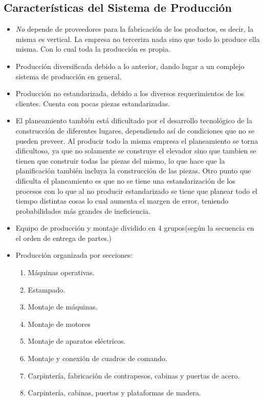 \subsection{Caracter\'{i}sticas del Sistema de Producci\'{o}n}
\begin{itemize}
	\item \emph{No} depende de proveedores para la fabricaci\'{o}n de los productos, es decir, la misma es vertical. La empresa no terceriza nada sino que todo lo produce ella misma. Con lo cual toda la producci\'{o}n es propia.
	\item Producci\'{o}n diversificada debido a lo anterior, dando lugar a un complejo sistema de producci\'on en general.
	\item Producci\'{o}n no estandarizada, debido a los diversos requerimientos de los clientes. Cuenta con pocas piezas estandarizadas.
	\item El planeamiento tambi\'{e}n est\'a dificultado por el desarrollo tecnol\'ogico de la construcci\'on de diferentes lugares, dependiendo as\'i de condiciones que no se pueden preveer. Al producir todo la misma empresa el planeamiento se torna dificultoso, ya que no solamente se construye el elevador sino que tambien se tienen que construir todas las piezas del mismo, lo que hace que la planificaci\'{o}n tambi\'{e}n incluya la construcci\'{o}n de las piezas. Otro punto que dificulta el planeamiento es que no se tiene una estandarizaci\'{o}n de los procesos con lo que al no producir estandarizado se tiene que planear todo el tiempo distintas cosas lo cual aumenta el margen de error, teniendo probabilidades m\'{a}s grandes de ineficiencia.
	\item Equipo de producci\'{o}n y montaje dividido en 4 grupos(seg\'{u}n la secuencia en el orden de entrega de partes.)
	\item Producci\'{o}n organizada por secciones:
	\begin{enumerate}
		\item M\'{a}quinas operativas.
		\item Estampado.
		\item Montaje de m\'{a}quinas.
		\item Montaje de motores
		\item Montaje de aparatos el\'{e}ctricos.
		\item Montaje y conexi\'{o}n de cuadros de comando.
		\item Carpinter\'{i}a, fabricaci\'{o}n de contrapesos, cabinas y 	puertas de acero.
		\item Carpinter\'ia, cabinas, puertas y plataformas de madera.

\end{enumerate}
\end{itemize}
